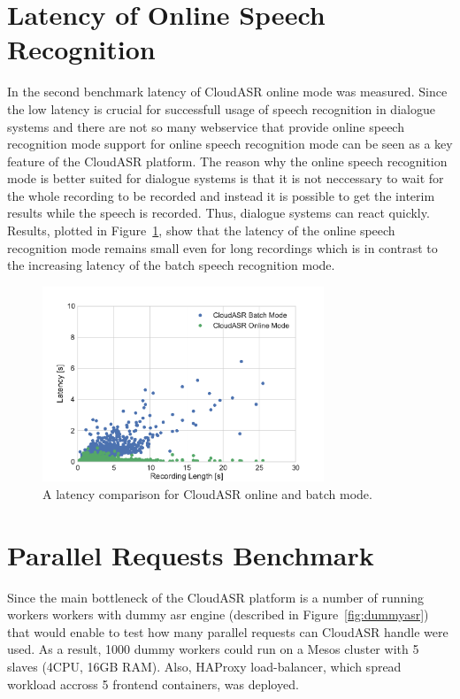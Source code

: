 \section{Latency of Online Speech Recognition}
In the second benchmark latency of CloudASR online mode was measured.
Since the low latency is crucial for successfull usage of speech recognition in dialogue systems
  and there are not so many webservice that provide online speech recognition mode
  support for online speech recognition mode can be seen as a key feature of the CloudASR platform.
The reason why the online speech recognition mode is better suited for dialogue systems is
  that it is not neccessary to wait for the whole recording to be recorded
  and instead it is possible to get the interim results while the speech is recorded.
Thus, dialogue systems can react quickly.
Results, plotted in Figure~\ref{fig:online-benchmark}, show that
  the latency of the online speech recognition mode remains small even for long recordings
  which is in contrast to the increasing latency of the batch speech recognition mode.

\begin{figure}[h]
  \centering
  \includegraphics[width=0.75\textwidth]{./img/online.pdf}

  \caption{
    A latency comparison for CloudASR online and batch mode.
  }
  \label{fig:online-benchmark}
\end{figure}


\section{Parallel Requests Benchmark}
Since the main bottleneck of the CloudASR platform is a number of running workers
  workers with dummy asr engine (described in Figure~\ref{fig:dummyasr})
  that would enable to test how many parallel requests can CloudASR handle were used.
As a result, 1000 dummy workers could run on a Mesos cluster with 5 slaves (4CPU, 16GB RAM).
Also, HAProxy load-balancer, which spread workload accross 5 frontend containers, was deployed.

